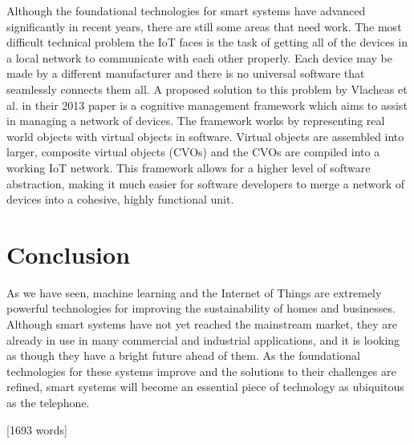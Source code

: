 \documentclass[letterpaper]{article}
\begin{document}
Although the foundational technologies for smart systems have advanced significantly in recent years, there are still some areas that need work. The most difficult technical problem the IoT faces is the task of getting all of the devices in a local network to communicate with each other properly. Each device may be made by a different manufacturer and there is no universal software that seamlessly connects them all. A proposed solution to this problem by Vlacheas et al. \cite{vlacheas13} in their 2013 paper is a cognitive management framework which aims to assist in managing a network of devices. The framework works by representing real world objects with virtual objects in software. Virtual objects are assembled into larger, composite virtual objects (CVOs) and the CVOs are compiled into a working IoT network. This framework allows for a higher level of software abstraction, making it much easier for software developers to merge a network of devices into a cohesive, highly functional unit.

\section{Conclusion} \label{conc}
As we have seen, machine learning and the Internet of Things are extremely powerful technologies for improving the sustainability of homes and businesses. Although smart systems have not yet reached the mainstream market, they are already in use in many commercial and industrial applications, and it is looking as though they have a bright future ahead of them. As the foundational technologies for these systems improve and the solutions to their challenges are refined, smart systems will become an essential piece of technology as ubiquitous as the telephone.

\vfill\hfill
[1693 words]

\clearpage
\pagestyle{references}
\printbibliography
\end{document}

